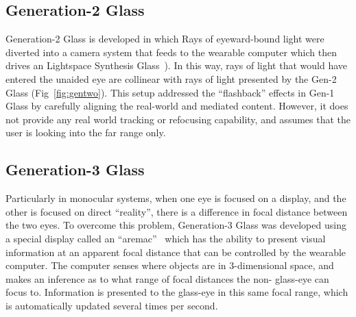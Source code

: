 \subsection{Generation-2 Glass}
Generation-2 Glass is developed in which Rays of eyeward-bound light were diverted into a camera 
system that feeds to the wearable computer which then drives an Lightspace Synthesis 
Glass~\cite{mann2001aremac}). In this way, rays of light that would have entered the unaided eye are 
collinear with rays of light presented by the Gen-2 Glass (Fig~\ref{fig:gentwo}). This setup addressed 
the ``flashback'' effects in Gen-1 Glass by carefully aligning the real-world and mediated content. 
However, it does not provide any real world tracking or refocusing capability, and assumes that the 
user is looking into the far range only.

\subsection{Generation-3 Glass}
Particularly in monocular systems, when one eye is focused on a display, and the other is focused on 
direct
``reality'', there is a difference in focal distance between the two eyes. To overcome this problem, 
Generation-3 Glass was developed using a special display called an 
``aremac''~\cite{mann2001aremac} which has the ability to present visual information at an apparent 
focal distance that can be controlled by the wearable computer. The computer senses where objects 
are in 3-dimensional space, and makes an inference as to what range of focal distances the non-
glass-eye can focus to. Information is presented to the glass-eye in this same focal range, which is 
automatically updated several times per second.

